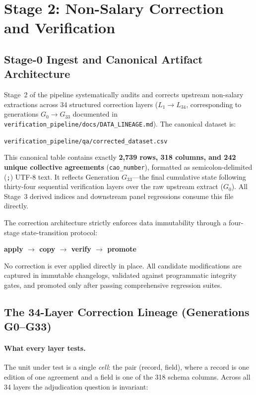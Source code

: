\section{Stage 2: Non-Salary Correction and Verification}
\label{sec:correction}

\subsection{Stage-0 Ingest and Canonical Artifact Architecture}

Stage~2 of the pipeline systematically audits and corrects upstream non-salary extractions across 34 structured correction layers ($L_1 \rightarrow L_{34}$, corresponding to generations $G_0 \rightarrow G_{33}$ documented in \nolinkurl{verification_pipeline/docs/DATA_LINEAGE.md}). The canonical dataset is:
\begin{center}
\nolinkurl{verification_pipeline/qa/corrected_dataset.csv}
\end{center}
This canonical table contains exactly \textbf{2,739 rows, 318 columns, and 242 unique collective agreements} (\texttt{cao\_number}), formatted as semicolon-delimited (\texttt{;}) UTF-8 text. It reflects Generation $G_{33}$---the final cumulative state following thirty-four sequential verification layers over the raw upstream extract ($G_0$). All Stage~3 derived indices and downstream panel regressions consume this file directly.

The correction architecture strictly enforces data immutability through a four-stage state-transition protocol:
\begin{center}
\textbf{apply $\longrightarrow$ copy $\longrightarrow$ verify $\longrightarrow$ promote}
\end{center}
No correction is ever applied directly in place. All candidate modifications are captured in immutable changelogs, validated against programmatic integrity gates, and promoted only after passing comprehensive regression suites.

\subsection{The 34-Layer Correction Lineage (Generations G0--G33)}

\paragraph{What every layer tests.} The unit under test is a single \emph{cell}: the pair (record, field), where a record is one edition of one agreement and a field is one of the 318 schema columns. Across all 34 layers the adjudication question is invariant:


